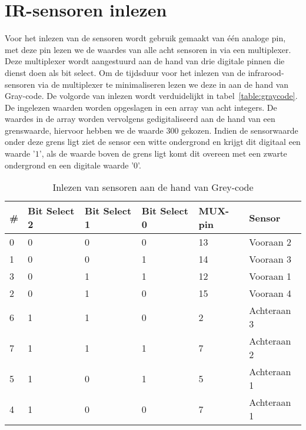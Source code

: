 \section{IR-sensoren inlezen}
Voor het inlezen van de sensoren wordt gebruik gemaakt van \'e\'en analoge pin, met deze pin lezen we de waardes van alle acht sensoren in via een multiplexer. Deze multiplexer wordt aangestuurd aan de hand van drie digitale pinnen die dienst doen als bit select. Om de tijdsduur voor het inlezen van de infrarood-sensoren via de multiplexer te minimaliseren lezen we deze in aan de hand van Gray-code. De volgorde van inlezen wordt verduidelijkt in tabel~\vref{table:graycode}. De ingelezen waarden worden opgeslagen in een array van acht integers. De waardes in de array worden vervolgens gedigitaliseerd aan de hand van een grenswaarde, hiervoor hebben we de waarde $300$ gekozen. Indien de sensorwaarde onder deze grens ligt ziet de sensor een witte ondergrond en krijgt dit digitaal een waarde '$1$', als de waarde boven de grens ligt komt dit overeen met een zwarte ondergrond en een digitale waarde '$0$'. 

\begin{table}[H]
	\centering
	\begin{tabular}{|l|l|l|l|l|l|}
		\hline
		\# & Bit Select 2 & Bit Select 1 & Bit Select 0 & MUX-pin & Sensor      \\ \hline
		0  & 0            & 0            & 0            & 13      & Vooraan 2   \\ \hline
		1  & 0            & 0            & 1            & 14      & Vooraan 3   \\ \hline
		3  & 0            & 1            & 1            & 12      & Vooraan 1   \\ \hline
		2  & 0            & 1            & 0            & 15      & Vooraan 4   \\ \hline
		6  & 1            & 1            & 0            & 2       & Achteraan 3 \\ \hline
		7  & 1            & 1            & 1            & 7       & Achteraan 2 \\ \hline
		5  & 1            & 0            & 1            & 5       & Achteraan 1 \\ \hline
		4  & 1            & 0            & 0            & 7       & Achteraan 1 \\ \hline
	\end{tabular}
	\caption{Inlezen van sensoren aan de hand van Grey-code}
	\label{table:graycode}
\end{table}

